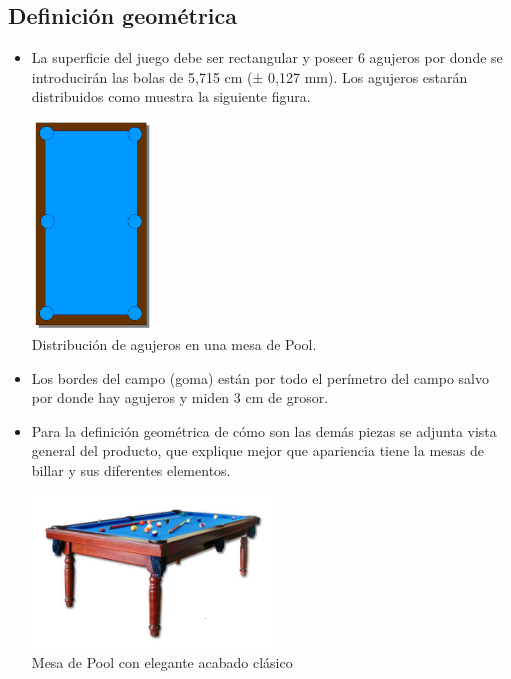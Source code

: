 	\subsection {Definición geométrica}
		    \begin{itemize}
		     \item La superficie del juego debe ser rectangular y poseer 6 agujeros por donde se introducirán las bolas de 5,715 cm (± 0,127 mm). Los agujeros estarán distribuidos como
			    muestra la siguiente figura.
		  \begin{center}
    			\includegraphics[width=0.25\textwidth]{billar.png} 
			\\ \small {Distribución de agujeros en una mesa de Pool.}
		\end{center}

		     \item Los bordes del campo (goma) están por todo el perímetro del campo salvo por donde hay agujeros y miden 3 cm de grosor.

		     \item Para la definición geométrica de cómo son las demás piezas  se adjunta vista general del producto, que explique mejor que apariencia tiene la mesas de billar
			  y sus diferentes elementos. 
		\begin{center}
    			\includegraphics[width=0.5\textwidth]{donbillar.png}
     \\ \small {Mesa de Pool con elegante acabado clásico}
		\end{center}	
		    \end{itemize}
		    

